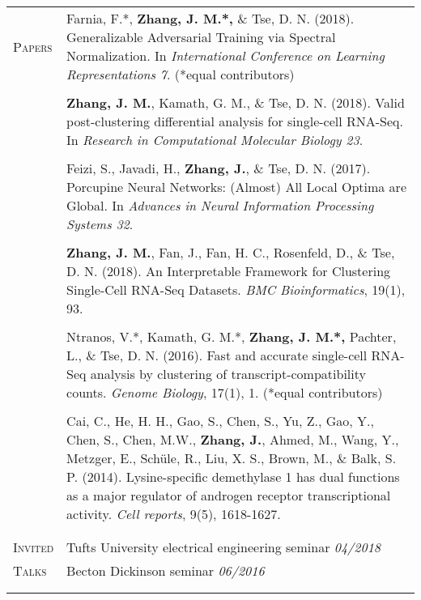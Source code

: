 \documentclass[letterpaper,11pt,oneside]{article}
\begin{document}
\begin{longtable}{@{} p{2.5cm} p{14.8cm}}
 \large{\textsc{Papers}}  & Farnia, F.*, \textbf{Zhang, J. M.*,} \& Tse, D. N. (2018). Generalizable Adversarial Training via Spectral Normalization. In \textit{International Conference on Learning Representations 7}. (*equal contributors) \\
 	& \\
 
 & \textbf{Zhang, J. M.}, Kamath, G. M., \& Tse, D. N. (2018). Valid post-clustering differential analysis for single-cell RNA-Seq. In \textit{Research in Computational Molecular Biology 23}. \\
 	& \\
 
 & Feizi, S., Javadi, H., \textbf{Zhang, J.}, \& Tse, D. N. (2017). Porcupine Neural Networks: (Almost) All Local Optima are Global. In \textit{Advances in Neural Information Processing Systems 32}. \\
 	& \\
 
     & \textbf{Zhang, J. M.}, Fan, J., Fan, H. C., Rosenfeld, D., \&  Tse, D. N. (2018). An Interpretable Framework for Clustering Single-Cell RNA-Seq Datasets. \textit{BMC Bioinformatics}, 19(1), 93. \\
     & \\
     
     & Ntranos, V.*, Kamath, G. M.*, \textbf{Zhang, J. M.*,} Pachter, L., \& Tse, D. N. (2016). Fast and accurate single-cell RNA-Seq analysis by clustering of transcript-compatibility counts. \textit{Genome Biology}, 17(1), 1. (*equal contributors) \\
     & \\
     
     & Cai, C., He, H. H., Gao, S., Chen, S., Yu, Z., Gao, Y., Chen, S., Chen, M.W., \textbf{Zhang, J.}, Ahmed, M., Wang, Y., Metzger, E., Sch\"{u}le, R., Liu, X. S., Brown, M., \& Balk, S. P. (2014). Lysine-specific demethylase 1 has dual functions as a major regulator of androgen receptor transcriptional activity. \textit{Cell reports}, 9(5), 1618-1627. \\
     & \\ 
     & \\
     

 \large{\textsc{Invited}}  & Tufts University electrical engineering seminar  \hfill \textit{04/2018}\\*
 \large{\textsc{Talks}} & Becton Dickinson seminar  \hfill \textit{06/2016} \\
 & \\
 & \\
    

\end{longtable}
\end{document}
